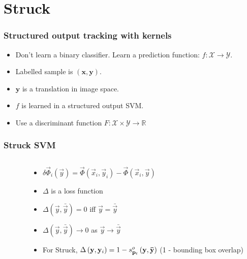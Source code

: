 \section{Struck}

\begin{frame}
    \frametitle{Structured output tracking with kernels \cite{6126251}}
    \begin{itemize}
        \item Don't learn a binary classifier. Learn a prediction function: \(f : \mathcal{X} \rightarrow \mathcal{Y}\).
        \item Labelled sample is \((\mathbf{x}, \mathbf{y})\).
        \item \(\mathbf{y}\) is a translation in image space.
        \item \(f\) is learned in a structured output SVM.
        \item Use a discriminant function \(F : \mathcal{X} \times \mathcal{Y} \to \mathbb{R}\)
            \struckDiscriminant
    \end{itemize}
\end{frame}

\begin{frame}
    \frametitle{Struck SVM}
    \begin{columns}[T]
        \begin{column}{0.5\textwidth}
            \struckEquation
        \end{column}
        \begin{column}{0.5\textwidth}
            \begin{itemize}
                \item \(\delta \vec{\Phi}_i \left( \vec{y} \right) = \vec{\Phi} \left( \vec{x}_i, \vec{y}_i \right) - \vec{\Phi} \left( \vec{x}_i, \vec{y} \right)\)
                \item \(\Delta\) is a loss function
                \item \(\Delta \left(\vec{y}, \bar{\vec{y}} \right) = 0\) iff \(\vec{y} =
                    \bar{\vec{y}}\)
                \item \(\Delta \left(\vec{y}, \bar{\vec{y}} \right) \to 0\) as \(\vec{y} \to
                    \bar{\vec{y}}\)
                \item For Struck, \(\Delta\left(\mathbf{y}, \mathbf{y}_i\right) = 1 - s_{\mathbf{p}_t}^o \left( \mathbf{y}, \mathbf{\bar{y}}
                    \right) \) (1 - bounding box overlap)
            \end{itemize}
        \end{column}
    \end{columns}
\end{frame}


